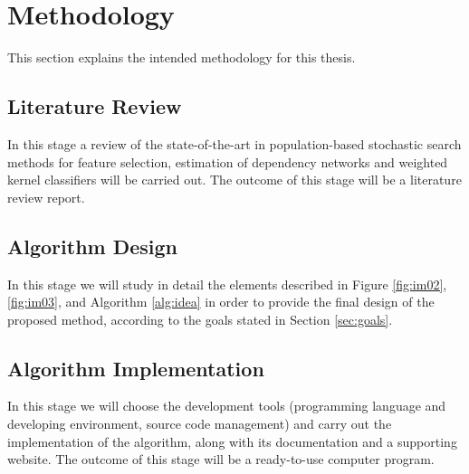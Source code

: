 
\section{Methodology}
This section explains the intended methodology for this thesis.

\subsection{Literature Review}
In this stage a review of the state-of-the-art in population-based stochastic search methods for feature selection, estimation of dependency networks and weighted kernel classifiers will be carried out. The outcome of this stage will be a literature review report.

\subsection{Algorithm Design}
In this stage we will study in detail the elements described in Figure \ref{fig:im02}, \ref{fig:im03}, and Algorithm \ref{alg:idea} in order to provide the final design of the proposed method, according to the goals stated in Section \ref{sec:goals}.  

\subsection{Algorithm Implementation}
In this stage we will choose the development tools (programming language and developing environment, source code management) and carry out the implementation of the algorithm, along with its documentation and a supporting website. The outcome of this stage will be a ready-to-use computer program.

